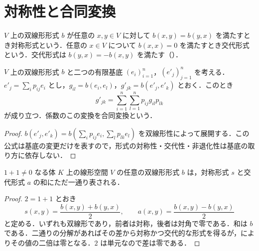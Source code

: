 \section{対称性と合同変換}
\begin{defn}[対称形式と交代形式]
$V$ 上の双線形形式 $b$ が任意の $x,y\in V$ に対して $b(x,y)=b(y,x)$ を満たすとき対称形式という．任意の $x\in V$ について $b(x,x)=0$ を満たすとき交代形式という．交代形式は $b(y,x)=-b(x,y)$ を満たす（）．
\end{defn}
\begin{prop}[双線形形式の合同変換]
$V$ 上の双線形形式 $b$ と二つの有限基底 $(e_i)_{i=1}^n$，$(e'_j)_{j=1}^n$ を考える．$e'_j=\sum_i p_{ij}e_i$ とし，$g_{il}=b(e_i,e_l)$，$g'_{jk}=b(e'_j,e'_k)$ とおく．このとき
\[
 g'_{jk}=\sum_{i=1}^n\sum_{l=1}^n p_{ij}g_{il}p_{lk}
\]
が成り立つ．係数のこの変換を合同変換という．
\end{prop}
\begin{proof}
$b(e'_j,e'_k)=b(\sum_i p_{ij}e_i,\sum_l p_{lk}e_l)$ を双線形性によって展開する．この公式は基底の変更だけを表すので，形式の対称性・交代性・非退化性は基底の取り方に依存しない．
\end{proof}
\begin{prop}[対称形式と交代形式への分解]
$1+1\ne0$ なる体 $K$ 上の線形空間 $V$ の任意の双線形形式 $b$ は，対称形式 $s$ と交代形式 $a$ の和にただ一通り表される．
\end{prop}
\begin{proof}
$2=1+1$ とおき
\[
 s(x,y)=\frac{b(x,y)+b(y,x)}2,\qquad
 a(x,y)=\frac{b(x,y)-b(y,x)}2
\]
と定める．いずれも双線形であり，前者は対称，後者は対角で零である．和は $b$ である．二通りの分解があればその差から対称かつ交代的な形式を得るが，によりその値の二倍は零となる．$2$ は単元なので差は零である．
\end{proof}
